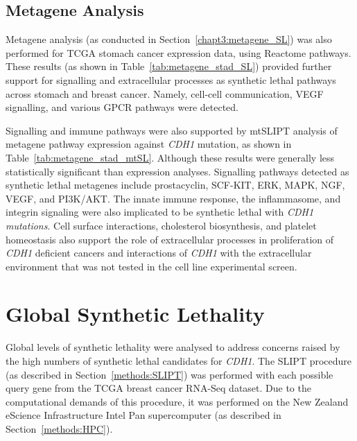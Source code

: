\FloatBarrier

\subsection{Metagene Analysis} \label{chapt3:metagene_stad_SL}

Metagene analysis (as conducted in Section~\ref{chapt3:metagene_SL}) was also performed for TCGA stomach cancer expression data, using Reactome pathways. These results (as shown in Table~\ref{tab:metagene_stad_SL}) provided further support for signalling and extracellular processes as synthetic lethal pathways across stomach and breast cancer. Namely, cell-cell communication, VEGF signalling, and various GPCR pathways were detected.  

Signalling and immune pathways were also supported by mtSLIPT analysis of metagene pathway expression against \textit{CDH1} mutation, as shown in Table~\ref{tab:metagene_stad_mtSL}. Although these results were generally less statistically significant than expression analyses. Signalling pathways detected as synthetic lethal metagenes include prostacyclin, SCF-KIT, ERK, MAPK, NGF, VEGF, and PI3K/AKT. The innate immune response, the inflammasome, and integrin signaling were also implicated to be synthetic lethal with \textit{CDH1 mutations}. Cell surface interactions, cholesterol biosynthesis, and platelet homeostasis also support the role of extracellular processes in proliferation of \textit{CDH1} deficient cancers and interactions of \textit{CDH1} with the extracellular environment that was not tested in the cell line experimental screen.


\FloatBarrier

\section{Global Synthetic Lethality}

Global levels of synthetic lethality were analysed to address concerns raised by the high numbers of synthetic lethal candidates for \textit{CDH1}. The \gls{SLIPT} procedure (as described in Section~\ref{methods:SLIPT}) was performed with each possible query gene from the TCGA breast cancer RNA-Seq dataset. Due to the computational demands of this procedure, it was performed on the New Zealand eScience Infrastructure Intel Pan supercomputer (as described in Section~\ref{methods:HPC}).

